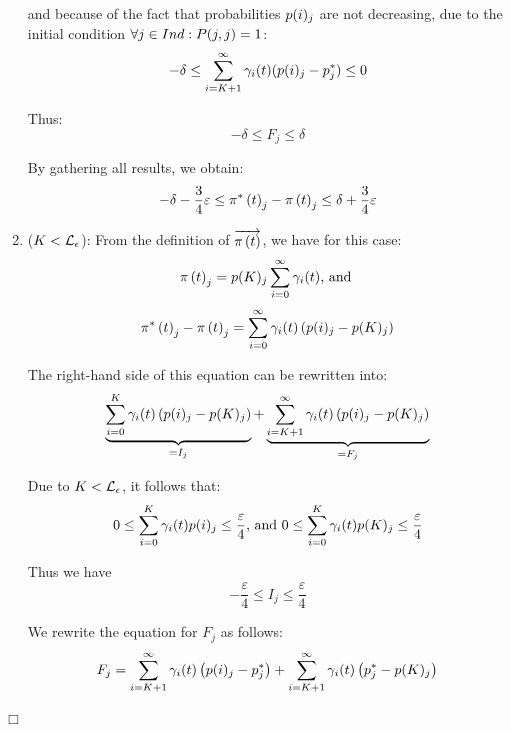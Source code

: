 \documentclass[a4paper,11pt]{article}
\newenvironment{proof}{\trivlist \item[\hskip \labelsep{\bf Proof}]}{\hfill\hbox{$\Box$}\endtrivlist}
\begin{document}
\begin{proof}
\begin{enumerate}
					 and because of the fact that probabilities $p(i)_{j}$ are not decreasing, due to the initial condition $\forall j \in Ind : P(j,j) = 1$:
					\begin{equation}
						 - \delta \leq \sum_{i=K+1}^{\infty}\gamma_{i}(t) (p(i)_{j} - p^{*}_{j}) \leq 0 \nonumber
					 \end{equation}

					 Thus:
					 \begin{equation}
							- \delta \leq F_{j} \leq \delta \nonumber
					 \end{equation}
					 
					 By gathering all results, we obtain:
					 \begin{equation}
							- \delta - \frac{3}{4} \varepsilon \leq \pi^{*} \left( t \right)_{j} - \pi \left( t \right)_{j} \leq \delta + \frac{3}{4} \varepsilon \nonumber
					\end{equation}

				\item ($K < \mathcal{L}_{\epsilon}$): 	From the definition of $\overrightarrow{\pi \left( t \right) }$, we have for this case:
					\begin{equation}
						\pi \left( t \right)_{j} = p(K)_{j} \sum_{i=0}^{\infty} \gamma_{i}(t) \text{, and } \nonumber
					\end{equation}
					\begin{equation}
						\pi^{*} \left( t \right)_{j} - \pi \left( t \right)_{j} = \sum_{i=0}^{\infty} \gamma_{i}(t) \left( p(i)_{j} - p(K)_{j} \right) \nonumber
					\end{equation}
	
						The right-hand side of this equation can be rewritten into:
					\begin{equation}
						\underbrace{\sum_{i=0}^{K} \gamma_{i}(t) \left( p(i)_{j} - p(K)_{j} \right)}_{ = I_{j}} + \underbrace{\sum_{i=K+1}^{\infty} \gamma_{i}(t) \left( p(i)_{j} - p(K)_{j} \right)}_{ = F_{j}} \nonumber
					\end{equation}

					Due to $K < \mathcal{L}_{\epsilon}$, it follows that:
					\begin{equation}
						 0 \leq \sum_{i=0}^{K} \gamma_{i}(t) p(i)_{j} \leq \frac{\varepsilon}{4} \text{, and } 0 \leq \sum_{i=0}^{K} \gamma_{i}(t) p(K)_{j} \leq \frac{\varepsilon}{4} \nonumber
					\end{equation}
					
					Thus we have
					\begin{equation}
						- \frac{\varepsilon}{4} \leq I_{j} \leq \frac{\varepsilon}{4} \nonumber
					\end{equation}
					
					We rewrite the equation for $F_{j}$ as follows:
					\begin{equation}
						F_{j} =	\sum_{i=K+1}^{\infty} \gamma_{i}(t) \left( p(i)_{j} - p^{*}_{j} \right) + \sum_{i=K+1}^{\infty} \gamma_{i}(t) \left( p^{*}_{j} - p(K)_{j} \right) \nonumber
					\end{equation}


\end{enumerate}
\end{proof}
\end{document}
